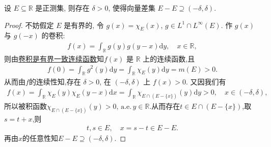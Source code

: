 \documentclass[../../main.tex]{subfiles}%
\begin{document}
\begin{proposition}
设 $E\subseteq \mathbb{R}$ 是正测集, 则存在 $\delta>0$, 使得向量差集 $E-E\supseteq (-\delta,\delta)$.
\end{proposition}
\begin{proof}
不妨假定 $E$ 是有界的, 令 $g(x)=\chi_E(x)$, $g\in L^1\cap L^\infty(E)$. 作 $g(x)$ 与 $g(-x)$ 的卷积:
\begin{align*}
f(x) = \int_{\mathbb{R}} g(y) g(y-x) \mathrm{d}y, \quad x\in \mathbb{R},
\end{align*}
则由\hyperref[proposition:卷积是有界一致连续函数]{卷积是有界一致连续函数}知$f(x)$ 是 $\mathbb{R}$ 上的连续函数,且
\begin{align*}
f(0) = \int_{\mathbb{R}} g^2(y) \mathrm{d}y = \int_{\mathbb{R}} \chi_E(y) \mathrm{d}y = m(E) > 0.
\end{align*}
从而由$f$的连续性知,存在 $\delta>0$, 在 $(-\delta,\delta)$ 上 $f(x)>0$. 又因我们有
\begin{align*}
f(x) = \int_{\mathbb{R}} \chi_E(y) \chi_E(y-x) \mathrm{d}x = \int_{\mathbb{R}} \chi_{E\cap (E-\{x\})}(y) \mathrm{d}y > 0, \quad x\in (-\delta,\delta),
\end{align*}
所以被积函数$\chi_{E\cap (E-\{x\})}(y)>0,\,\text{a.e.}\,y\in \mathbb{R}$.从而存在$t\in E\cap (E-\{x\})$,取$s=t+x$,则
\begin{align*}
t,s\in E,\quad x=s-t\in E-E.
\end{align*}
再由$x$的任意性知$E-E\supseteq (-\delta,\delta)$.
\end{proof}
\end{document}
